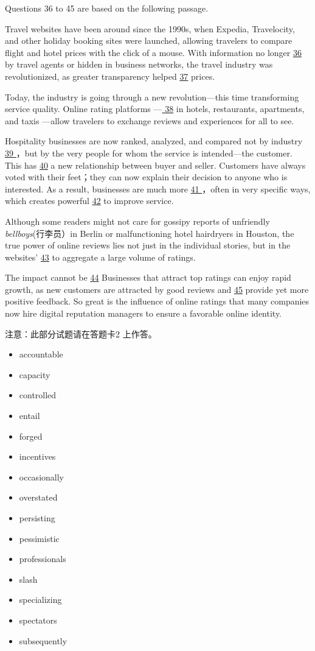 \documentclass[UTF8,11pt]{ctexart}
\begin{document}
Questions 36 to 45 are based on the following passage.


Travel websites have been around since the 1990s, when Expedia, Travelocity, and other holiday booking sites were launched, allowing travelers to compare flight and hotel prices with the click of a mouse. With information no longer \uline{36} by travel agents or hidden in business networks, the travel industry was revolutionized, as greater transparency helped \uline{37} prices.


Today, the industry is going through a new revolution—this time transforming service quality. Online rating platforms —\uline{ 38} in hotels, restaurants, apartments, and taxis —allow travelers to exchange reviews and experiences for all to see.


Hospitality businesses are now ranked, analyzed, and compared not by industry \uline{39 }，but by the very people for whom the service is intended—the customer. This has \uline{40} a new relationship between buyer and seller. Customers have always voted with their feet；they can now explain their decision to anyone who is interested. As a result, businesses are much more \uline{41 }，often in very specific ways, which creates powerful \uline{42} to improve service.


Although some readers might not care for gossipy reports of unfriendly\textit{ bellboys}(行李员）in Berlin or malfunctioning hotel hairdryers in Houston, the true power of online reviews lies not just in the individual stories, but in the websites’ \uline{43} to aggregate a large volume of ratings.


The impact cannot be \uline{44} Businesses that attract top ratings can enjoy rapid growth, as new customers are attracted by good reviews and \uline{45} provide yet more positive feedback. So great is the influence of online ratings that many companies now hire digital reputation managers to ensure a favorable online identity.


注意：此部分试题请在答题卡2 上作答。


\begin{itemize}[leftmargin=2em,itemsep=.2em,topsep=.4em]\item[A.] accountable
\item[B.] capacity
\item[C.] controlled
\item[D.] entail
\item[E.] forged
\item[F.] incentives
\item[G.] occasionally
\item[H.] overstated
\item[I.] persisting
\item[J.] pessimistic
\item[K.] professionals
\item[L.] slash
\item[M.] specializing
\item[N.] spectators
\item[O.] subsequently
\end{itemize}
\end{document}
